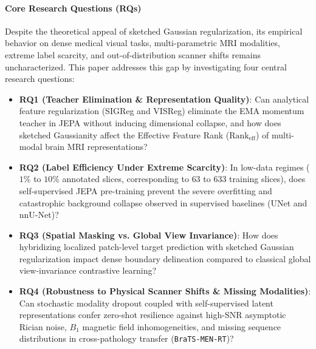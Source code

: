 \documentclass{article}
\begin{document}
\paragraph{Core Research Questions (RQs)}
Despite the theoretical appeal of sketched Gaussian regularization, its empirical behavior on dense medical visual tasks, multi-parametric MRI modalities, extreme label scarcity, and out-of-distribution scanner shifts remains uncharacterized. This paper addresses this gap by investigating four central research questions:
\begin{itemize}
    \item \textbf{RQ1 (Teacher Elimination \& Representation Quality)}: Can analytical feature regularization (SIGReg and VISReg) eliminate the EMA momentum teacher in JEPA without inducing dimensional collapse, and how does sketched Gaussianity affect the Effective Feature Rank ($\text{Rank}_{\text{eff}}$) of multi-modal brain MRI representations?
    \item \textbf{RQ2 (Label Efficiency Under Extreme Scarcity)}: In low-data regimes ($1\%$ to $10\%$ annotated slices, corresponding to $63$ to $633$ training slices), does self-supervised JEPA pre-training prevent the severe overfitting and catastrophic background collapse observed in supervised baselines (UNet and nnU-Net)?
    \item \textbf{RQ3 (Spatial Masking vs. Global View Invariance)}: How does hybridizing localized patch-level target prediction with sketched Gaussian regularization impact dense boundary delineation compared to classical global view-invariance contrastive learning?
    \item \textbf{RQ4 (Robustness to Physical Scanner Shifts \& Missing Modalities)}: Can stochastic modality dropout coupled with self-supervised latent representations confer zero-shot resilience against high-SNR asymptotic Rician noise, $B_1$ magnetic field inhomogeneities, and missing sequence distributions in cross-pathology transfer (\texttt{BraTS-MEN-RT})?
\end{itemize}
\end{document}
